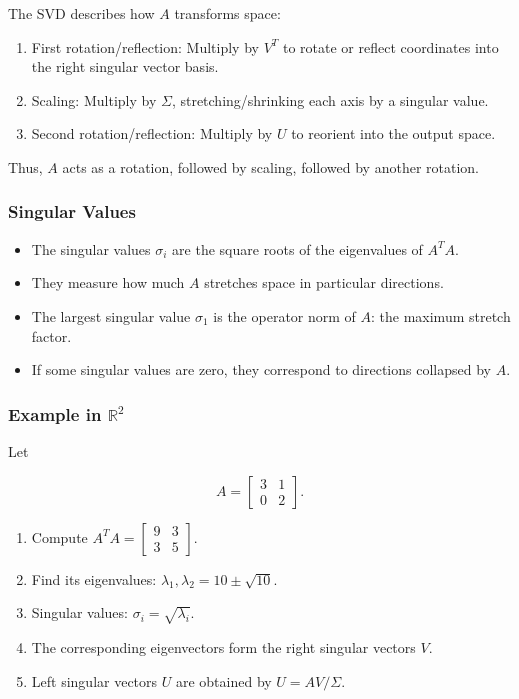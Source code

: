 \documentclass[
  letterpaper,
  DIV=11,
  numbers=noendperiod]{scrreprt}
\providecommand{\tightlist}{%
  \setlength{\itemsep}{0pt}\setlength{\parskip}{0pt}}
\begin{document}
The SVD describes how \(A\) transforms space:

\begin{enumerate}
\def\labelenumi{\arabic{enumi}.}
\tightlist
\item
  First rotation/reflection: Multiply by \(V^T\) to rotate or reflect
  coordinates into the right singular vector basis.
\item
  Scaling: Multiply by \(\Sigma\), stretching/shrinking each axis by a
  singular value.
\item
  Second rotation/reflection: Multiply by \(U\) to reorient into the
  output space.
\end{enumerate}

Thus, \(A\) acts as a rotation, followed by scaling, followed by another
rotation.

\subsubsection{Singular Values}\label{singular-values}

\begin{itemize}
\tightlist
\item
  The singular values \(\sigma_i\) are the square roots of the
  eigenvalues of \(A^T A\).
\item
  They measure how much \(A\) stretches space in particular directions.
\item
  The largest singular value \(\sigma_1\) is the operator norm of \(A\):
  the maximum stretch factor.
\item
  If some singular values are zero, they correspond to directions
  collapsed by \(A\).
\end{itemize}

\subsubsection{\texorpdfstring{Example in
\(\mathbb{R}^2\)}{Example in \textbackslash mathbb\{R\}\^{}2}}\label{example-in-mathbbr2-6}

Let

\[
A = \begin{bmatrix} 3 & 1 \\ 0 & 2 \end{bmatrix}.
\]

\begin{enumerate}
\def\labelenumi{\arabic{enumi}.}
\tightlist
\item
  Compute \(A^T A = \begin{bmatrix} 9 & 3 \\ 3 & 5 \end{bmatrix}\).
\item
  Find its eigenvalues: \(\lambda_1, \lambda_2 = 10 \pm \sqrt{10}\).
\item
  Singular values: \(\sigma_i = \sqrt{\lambda_i}\).
\item
  The corresponding eigenvectors form the right singular vectors \(V\).
\item
  Left singular vectors \(U\) are obtained by \(U = AV/\Sigma\).
\end{enumerate}
\end{document}
